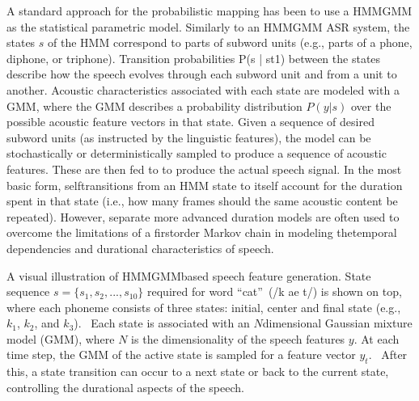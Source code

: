 \documentclass[letterpaper,10pt,english]{jupyterBook}
\begin{document}
\sphinxAtStartPar
A standard approach for the probabilistic mapping has been to use a
HMM\sphinxhyphen{}GMM as the statistical parametric model. Similarly to an HMM\sphinxhyphen{}GMM ASR
system, the states \(s\) of the HMM correspond to parts of subword units
(e.g., parts of a phone, diphone, or triphone). Transition probabilities
P(s | st\sphinxhyphen{}1) between the states describe how the speech evolves through
each subword unit and from a unit to another. Acoustic characteristics
associated with each state are modeled with a GMM, where the GMM
describes a probability distribution \(P(y | s)\) over the possible
acoustic feature vectors in that state. Given a sequence of desired
subword units (as instructed by the linguistic features), the model can
be stochastically or deterministically sampled to produce a sequence of
acoustic features. These are then fed to 
to produce the actual speech signal. In the most basic form,
self\sphinxhyphen{}transitions from an HMM state to itself account for the duration
spent in that state (i.e., how many frames should the same acoustic
content be repeated). However, separate more advanced duration models
are often used to overcome the limitations of a first\sphinxhyphen{}order Markov chain
in modeling thetemporal dependencies and durational characteristics of
speech.

\sphinxAtStartPar
{}

\sphinxAtStartPar
{} A visual illustration of HMM\sphinxhyphen{}GMM\sphinxhyphen{}based speech feature
generation. State sequence \(s = \{s_1, s_2,...,s_{10}\}\) required for word “cat” (/k ae t/) is shown on
top, where each phoneme consists of three states: initial, center and
final state (e.g., \(k_{1}\), \(k_{2}\), and \(k_{3}\)). 
Each state is associated with an \(N\)\sphinxhyphen{}dimensional Gaussian mixture model
(GMM), where \(N\) is the dimensionality of the speech features \(y\). At
each time step, the GMM of the active state is sampled for a feature
vector \(y_{t}\).  After this, a state transition can occur to
a next state or back to the current state, controlling the durational
aspects of the speech.
\end{document}
